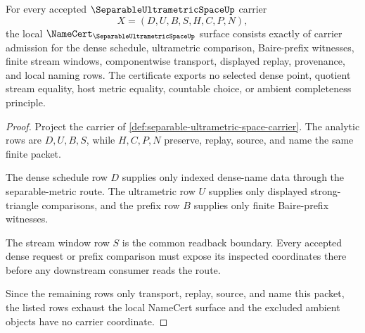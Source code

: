 \begin{theorem}
\label{thm:separable-ultrametric-space-namecert-obligations}
For every accepted $\SeparableUltrametricSpaceUp$ carrier
$$
X=(D,U,B,S,H,C,P,N),
$$
the local $\NameCert_{\SeparableUltrametricSpaceUp}$ surface consists exactly of carrier admission for the dense schedule, ultrametric comparison, Baire-prefix witnesses, finite stream windows, componentwise transport, displayed replay, provenance, and local naming rows. The certificate exports no selected dense point, quotient stream equality, host metric equality, countable choice, or ambient completeness principle.
\end{theorem}
\begin{proof}
Project the carrier of \autoref{def:separable-ultrametric-space-carrier}. The analytic rows are $D,U,B,S$, while $H,C,P,N$ preserve, replay, source, and name the same finite packet.

The dense schedule row $D$ supplies only indexed dense-name data through the separable-metric route. The ultrametric row $U$ supplies only displayed strong-triangle comparisons, and the prefix row $B$ supplies only finite Baire-prefix witnesses.

The stream window row $S$ is the common readback boundary. Every accepted dense request or prefix comparison must expose its inspected coordinates there before any downstream consumer reads the route.

Since the remaining rows only transport, replay, source, and name this packet, the listed rows exhaust the local NameCert surface and the excluded ambient objects have no carrier coordinate.
\end{proof}

